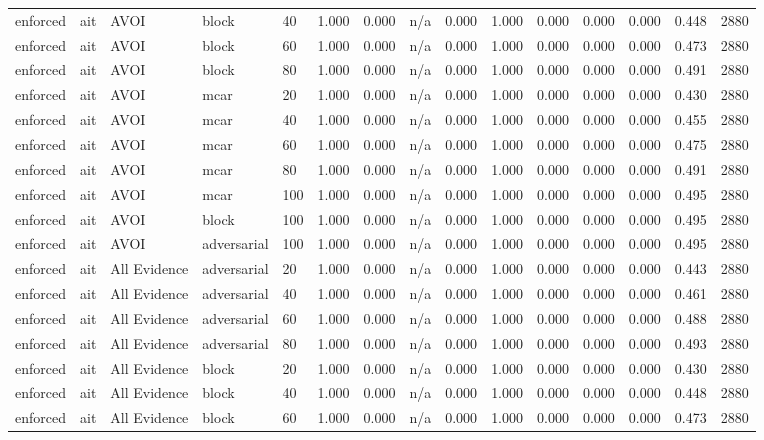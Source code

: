 \begin{table}[!ht]
{\begin{tabular}{lllllllllllllll}
enforced & ait & AVOI & block & 40 & 1.000 & 0.000 & n/a & 0.000 & 1.000 & 0.000 & 0.000 & 0.000 & 0.448 & 2880 \\
enforced & ait & AVOI & block & 60 & 1.000 & 0.000 & n/a & 0.000 & 1.000 & 0.000 & 0.000 & 0.000 & 0.473 & 2880 \\
enforced & ait & AVOI & block & 80 & 1.000 & 0.000 & n/a & 0.000 & 1.000 & 0.000 & 0.000 & 0.000 & 0.491 & 2880 \\
enforced & ait & AVOI & mcar & 20 & 1.000 & 0.000 & n/a & 0.000 & 1.000 & 0.000 & 0.000 & 0.000 & 0.430 & 2880 \\
enforced & ait & AVOI & mcar & 40 & 1.000 & 0.000 & n/a & 0.000 & 1.000 & 0.000 & 0.000 & 0.000 & 0.455 & 2880 \\
enforced & ait & AVOI & mcar & 60 & 1.000 & 0.000 & n/a & 0.000 & 1.000 & 0.000 & 0.000 & 0.000 & 0.475 & 2880 \\
enforced & ait & AVOI & mcar & 80 & 1.000 & 0.000 & n/a & 0.000 & 1.000 & 0.000 & 0.000 & 0.000 & 0.491 & 2880 \\
enforced & ait & AVOI & mcar & 100 & 1.000 & 0.000 & n/a & 0.000 & 1.000 & 0.000 & 0.000 & 0.000 & 0.495 & 2880 \\
enforced & ait & AVOI & block & 100 & 1.000 & 0.000 & n/a & 0.000 & 1.000 & 0.000 & 0.000 & 0.000 & 0.495 & 2880 \\
enforced & ait & AVOI & adversarial & 100 & 1.000 & 0.000 & n/a & 0.000 & 1.000 & 0.000 & 0.000 & 0.000 & 0.495 & 2880 \\
enforced & ait & All Evidence & adversarial & 20 & 1.000 & 0.000 & n/a & 0.000 & 1.000 & 0.000 & 0.000 & 0.000 & 0.443 & 2880 \\
enforced & ait & All Evidence & adversarial & 40 & 1.000 & 0.000 & n/a & 0.000 & 1.000 & 0.000 & 0.000 & 0.000 & 0.461 & 2880 \\
enforced & ait & All Evidence & adversarial & 60 & 1.000 & 0.000 & n/a & 0.000 & 1.000 & 0.000 & 0.000 & 0.000 & 0.488 & 2880 \\
enforced & ait & All Evidence & adversarial & 80 & 1.000 & 0.000 & n/a & 0.000 & 1.000 & 0.000 & 0.000 & 0.000 & 0.493 & 2880 \\
enforced & ait & All Evidence & block & 20 & 1.000 & 0.000 & n/a & 0.000 & 1.000 & 0.000 & 0.000 & 0.000 & 0.430 & 2880 \\
enforced & ait & All Evidence & block & 40 & 1.000 & 0.000 & n/a & 0.000 & 1.000 & 0.000 & 0.000 & 0.000 & 0.448 & 2880 \\
enforced & ait & All Evidence & block & 60 & 1.000 & 0.000 & n/a & 0.000 & 1.000 & 0.000 & 0.000 & 0.000 & 0.473 & 2880 \\

\end{tabular}}
\end{table}
